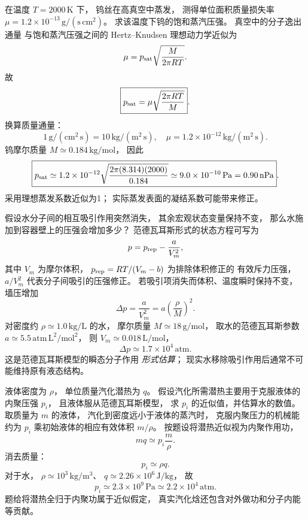 在温度 $T=2000\,\mathrm K$ 下，
钨丝在高真空中蒸发，
测得单位面积质量损失率
$\mu=1.2\times10^{-13}\,
\mathrm{g/(s\,cm^2)}$。
求该温度下钨的饱和蒸汽压强。
\exsolution
真空中的分子逸出通量
与饱和蒸汽压强之间的 Hertz--Knudsen
理想动力学近似为
\[
\mu=p_{\rm sat}\sqrt{\frac{M}{2\pi RT}}.
\]
故
\[
\boxed{p_{\rm sat}=
\mu\sqrt{\frac{2\pi RT}{M}}}.
\]
换算质量通量：
\[
1\,\mathrm{g/(cm^2\,s)}
=10\,\mathrm{kg/(m^2\,s)},
\quad
\mu=1.2\times10^{-12}\,\mathrm{kg/(m^2\,s)}.
\]
钨摩尔质量
$M\simeq0.184\,\mathrm{kg/mol}$，
因此
\[
\boxed{p_{\rm sat}\simeq
1.2\times10^{-12}
\sqrt{\frac{2\pi(8.314)(2000)}{0.184}}
\simeq9.0\times10^{-10}\,\mathrm{Pa}
=0.90\,\mathrm{nPa}}.
\]
\excheck 采用理想蒸发系数近似为1；
实际蒸发表面的凝结系数可能带来修正。

假设水分子间的相互吸引作用突然消失，
其余宏观状态变量保持不变，
那么水施加到容器壁上的压强会增加多少？
\exsolution
范德瓦耳斯形式的状态方程可写为
\[
p=p_{\rm rep}-\frac{a}{V_m^2},
\]
其中 $V_m$ 为摩尔体积，
$p_{\rm rep}=RT/(V_m-b)$ 为排除体积修正的
有效斥力压强，
$a/V_m^2$ 代表分子间吸引的压强修正。
若吸引项消失而体积、温度瞬时保持不变，
墙压增加
\[
\boxed{\Delta p=\frac a{V_m^2}
=a\left(\frac{\rho}{M}\right)^2}.
\]
对密度约
$\rho\simeq1.0\,\mathrm{kg/L}$ 的水，
摩尔质量 $M\simeq18\,\mathrm{g/mol}$，
取水的范德瓦耳斯参数
$a\simeq5.5\,\mathrm{atm\,L^2/mol^2}$，
则
$V_m\simeq0.018\,\mathrm{L/mol}$，
\[
\boxed{\Delta p\simeq1.7\times10^4\,\mathrm{atm}}.
\]
\excheck 这是范德瓦耳斯模型的瞬态分子作用
\emph{形式估算}；
现实水移除吸引作用后通常不可能维持原有液态结构。

液体密度为 $\rho$，
单位质量汽化潜热为 $q$。
假设汽化所需潜热主要用于克服液体的
内聚压强 $p_i$，
且液体服从范德瓦耳斯模型，
求 $p_i$ 的近似值，并估算水的数值。
\exsolution
取质量为 $m$ 的液体，
汽化到密度远小于液体的蒸汽时，
克服内聚压力的机械能约为
$p_i$ 乘初始液体的相应有效体积
$m/\rho$。
按题设将潜热近似视为内聚作用功，
\[
mq\simeq p_i\frac m\rho.
\]
消去质量：
\[
\boxed{p_i\simeq\rho q}.
\]
对于水，
$\rho\simeq10^3\,\mathrm{kg/m^3}$、
$q\simeq2.26\times10^6\,\mathrm{J/kg}$，
故
\[
\boxed{p_i\simeq2.3\times10^9\,\mathrm{Pa}
\simeq2.2\times10^4\,\mathrm{atm}}.
\]
\excheck 题给将潜热全归于内聚功属于近似假定，
真实汽化焓还包含对外做功和分子内能等贡献。

